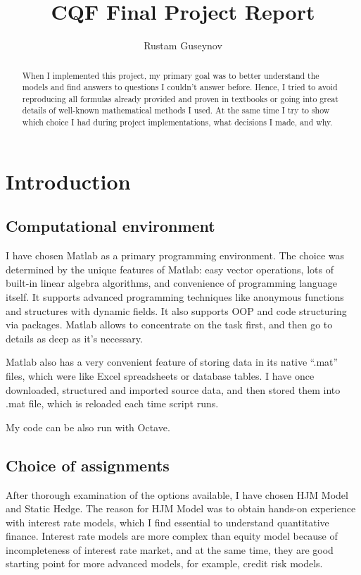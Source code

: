 \documentclass[11pt]{article} %
\title{CQF Final Project Report}
\author{Rustam Guseynov}
\begin{document}
\maketitle
\begin{abstract}
When I implemented this project, my primary goal was to better understand the models and find answers to questions I couldn't answer before. Hence, I tried to avoid reproducing all formulas already provided and proven in textbooks or going into great details of well-known mathematical methods I used. At the same time I try to show which choice I had during project implementations, what decisions I made, and why.
\end{abstract}

\section{Introduction}
\subsection{Computational environment}
I have chosen Matlab as a primary programming environment. The choice was determined by the unique features of Matlab: easy vector operations, lots of built-in linear algebra algorithms, and convenience of programming language itself. It supports advanced programming techniques like anonymous functions and structures with dynamic fields. It also supports OOP and code structuring via packages. Matlab allows to concentrate on the task first, and then go to details as deep as it's necessary.

Matlab also has a very convenient feature of storing data in its native ``.mat'' files, which were like Excel spreadsheets or database tables. I have once downloaded, structured and imported source data, and then stored them into .mat file, which is reloaded each time script runs.

My code can be also run with Octave.
\subsection{Choice of assignments}
After thorough examination of the options available, I have chosen HJM Model and Static Hedge. The reason for HJM Model was to obtain hands-on experience with interest rate models, which I find essential to understand quantitative finance. Interest rate models are more complex than equity model because of incompleteness of interest rate market, and at the same time, they are good starting point for more advanced models, for example, credit risk models.
\end{document}
